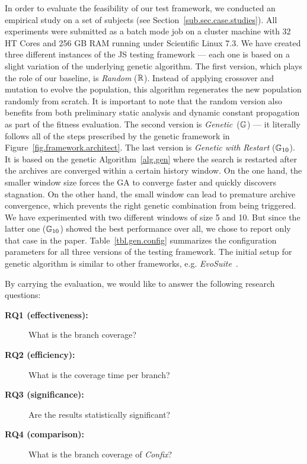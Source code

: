 In order to evaluate the feasibility of our test framework, we conducted an empirical study on a set of subjects (see Section~\ref{sub.sec.case.studies}). All experiments were submitted as a batch mode job on a cluster machine with 32 HT Cores and 256 GB RAM running under Scientific Linux 7.3. We have created three different instances of the JS testing framework --- each one is based on a slight variation of the underlying genetic algorithm. The first version, which plays the role of our baseline, is \emph{Random} ($\mathbb{R}$). Instead of applying crossover and mutation to evolve the population, this algorithm regenerates the new population randomly from scratch. It is important to note  that the random version also benefits from both preliminary static analysis and dynamic constant propagation as part of the fitness evaluation. The second version is \emph{Genetic}~($\mathbb{G}$) --- it literally follows all of the steps prescribed by the genetic framework in Figure~\ref{fig.framework.architect}. The last version is \emph{Genetic with Restart} ($\mathbb{G}_{10}$). It is based on the genetic Algorithm~\ref{alg.gen} where the search is restarted after the archives are converged within a certain history window. On the one hand, the smaller window size forces the GA to converge faster and quickly discovers stagnation. On the other hand, the small window can lead to premature archive convergence, which prevents the right genetic combination from being triggered. We have experimented with two different windows of size 5 and 10. But since the latter one ($\mathbb{G}_{10}$) showed the best performance over all, we chose to report only that case in the paper. Table~\ref{tbl.gen.config} summarizes the configuration parameters for all three versions of the testing framework. The initial setup for genetic algorithm is similar to other frameworks, e.g. \emph{EvoSuite}~\cite{fraser2011evosuite}.

By carrying the evaluation, we would like to answer the following research questions:
\begin{description}
\item[\textbf{RQ1 (effectiveness):}] What is the branch coverage?
\item[\textbf{RQ2 (efficiency):}] What is the coverage time per branch?
\item[\textbf{RQ3 (significance):}] Are the results statistically significant?
\item[\textbf{RQ4 (comparison):}] What is the branch coverage of \emph{Confix}?
\end{description}


